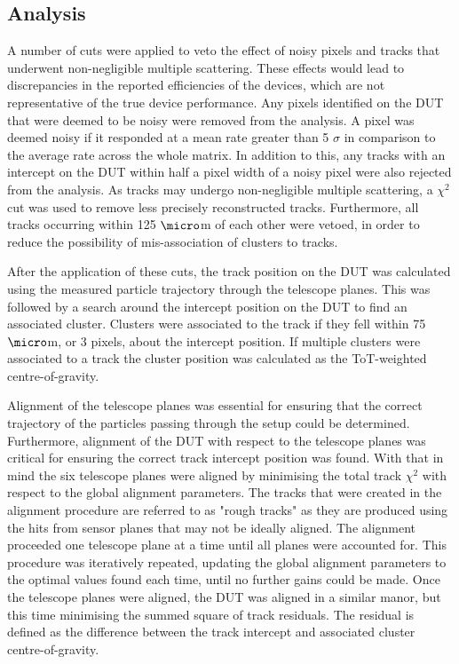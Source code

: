 \subsection{Analysis}
A number of cuts were applied to veto the effect of noisy pixels and tracks that underwent non-negligible multiple scattering.  These effects would lead to discrepancies in the reported efficiencies of the devices, which are not representative of the true device performance.  Any pixels identified on the DUT that were deemed to be noisy were removed from the analysis.  A pixel was deemed noisy if it responded at a mean rate greater than 5 $\sigma$ in comparison to the average rate across the whole matrix.  In addition to this, any tracks with an intercept on the DUT within half a pixel width of a noisy pixel were also rejected from the analysis.  As tracks may undergo non-negligible multiple scattering, a $\chi^{2}$ cut was used to remove less precisely reconstructed tracks.  Furthermore, all tracks occurring within 125 $\micro$m of each other were vetoed, in order to reduce the possibility of mis-association of clusters to tracks. 

After the application of these cuts, the track position on the DUT was calculated using the measured particle trajectory through the telescope planes.  This was followed by a search around the intercept position on the DUT to find an associated cluster.  Clusters were associated to the track if they fell within 75 $\micro$m, or 3 pixels, about the intercept position.  If multiple clusters were associated to a track the cluster position was calculated as the ToT-weighted centre-of-gravity.  

Alignment of the telescope planes was essential for ensuring that the correct trajectory of the particles passing through the setup could be determined.  Furthermore, alignment of the DUT with respect to the telescope planes was critical for ensuring the correct track intercept position was found.  With that in mind the six telescope planes were aligned by minimising the total track $\chi^{2}$ with respect to the global alignment parameters.  The tracks that were created in the alignment procedure are referred to as "rough tracks" as they are produced using the hits from sensor planes that may not be ideally aligned.  The alignment proceeded one telescope plane at a time until all planes were accounted for.  This procedure was iteratively repeated, updating the global alignment parameters to the optimal values found each time, until no further gains could be made.  Once the telescope planes were aligned, the DUT was aligned in a similar manor, but this time minimising the summed square of track residuals.  The residual is defined as the difference between the track intercept and associated cluster centre-of-gravity.  

